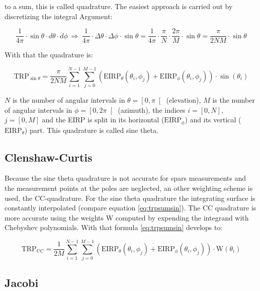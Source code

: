 to a sum, this is called quadrature. The easiest approach is carried out by discretizing the integral Argument:  \cite{ctiaat}

\begin{equation}
\frac{1}{4\pi}\cdot\sin\theta\cdot d\theta\cdot d\phi \ \Rightarrow\ \frac{1}{4\pi}\cdot \Delta\theta\cdot \Delta\phi\cdot\sin\theta = \frac{1}{4\pi}\cdot \frac{\pi}{N}\cdot \frac{2\pi}{M}\cdot\sin\theta=\frac{\pi}{2NM}\cdot\sin\theta
\end{equation}

With that the quadrature is:

\begin{equation}
\text{TRP}_{\sin\theta} = \frac{\pi}{2NM}\sum^{N-1}_{i=1}\sum^{M-1}_{j=0}\left(\text{EIRP}_\theta\left(\theta_i,\phi_j\right)+\text{EIRP}_\phi\left(\theta_i,\phi_j\right)\right)\cdot\sin\left(\theta_i\right)
\label{eq:trpsumsin}
\end{equation}

$N$ is the number of angular intervals in $\theta=\left[0,\pi\right[$ (elevation), $M$ is the number of angular intervals in $\phi=\left[0,2\pi\right[$ (azimuth), the indices $i=\left[0,N\right]$, $j=\left[0,M\right]$ and the \ac{EIRP} is split in its horizontal ($\text{EIRP}_\phi$) and its vertical ($\text{EIRP}_\theta$) part. This quadrature is called sine theta.

\subsection{Clenshaw-Curtis}

Because the sine theta quadrature is not accurate for spars measurements and the measurement points at the poles are neglected, an other weighting scheme is used, the \ac{CC}-quadrature. For the sine theta quadrature the integrating surface is constantly interpolated (compare equation \ref{eq:trpsumsin}). The \ac{CC} quadrature is more accurate using the weights W computed by expending the integrand with Chebyshev polynomials. With that formula \ref{eq:trpsumsin} develops to: \cite{trp}

\begin{equation}
\text{TRP}_{\text{CC}} = \frac{1}{2M}\sum^{N-1}_{i=1}\sum^{M-1}_{j=0}\left(\text{EIRP}_\theta\left(\theta_i,\phi_j\right)+\text{EIRP}_\phi\left(\theta_i,\phi_j\right)\right)\cdot\text{W}\left(\theta_i\right)
\label{eq:trpsumcc}
\end{equation}

\subsection{Jacobi}

